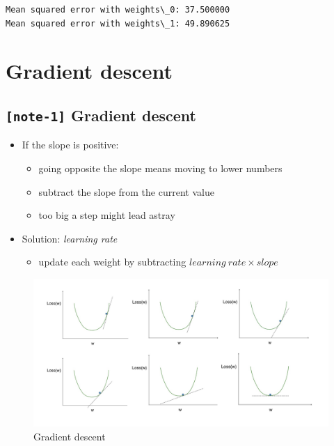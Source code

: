 \documentclass[11pt, twoside]{article}
\providecommand{\tightlist}{%
      \setlength{\itemsep}{0pt}\setlength{\parskip}{0pt}}
\begin{document}
    \begin{Verbatim}[commandchars=\\\{\}]
Mean squared error with weights\_0: 37.500000
Mean squared error with weights\_1: 49.890625
    \end{Verbatim}

    \hypertarget{gradient-descent}{%
\section{Gradient descent}\label{gradient-descent}}

    \hypertarget{note-1-gradient-descent}{%
\subsection{\texorpdfstring{\texttt{{[}note-1{]}} Gradient
descent}{{[}note-1{]} Gradient descent}}\label{note-1-gradient-descent}}

\begin{itemize}
\item
  If the slope is positive:

  \begin{itemize}
  \item
    going opposite the slope means moving to lower numbers
  \item
    subtract the slope from the current value
  \item
    too big a step might lead astray
  \end{itemize}
\item
  Solution: \emph{learning rate}

  \begin{itemize}
  \tightlist
  \item
    update each weight by subtracting \(learning\ rate \times slope\)
  \end{itemize}
\end{itemize}

\begin{figure}
\centering
\includegraphics{../Figures/7. Gradient descent.jpg}
\caption{Gradient descent}
\end{figure}
\end{document}
